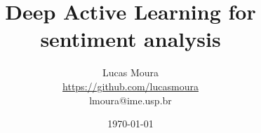 \title{Deep Active Learning for sentiment analysis}
\date{\today}

\author{
  Lucas Moura\\
  \url{https://github.com/lucasmoura}\\
  lmoura@ime.usp.br
}

